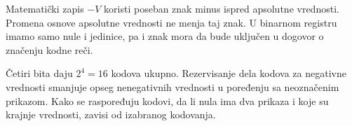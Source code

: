 
Matematički zapis $-V$ koristi poseban znak minus ispred apsolutne vrednosti. Promena osnove apsolutne vrednosti ne menja taj znak. U binarnom registru imamo samo nule i jedinice, pa i znak mora da bude uključen u dogovor o značenju kodne reči.

Četiri bita daju $2^4=16$ kodova ukupno. Rezervisanje dela kodova za negativne vrednosti smanjuje opseg nenegativnih vrednosti u poređenju sa neoznačenim prikazom. Kako se raspoređuju kodovi, da li nula ima dva prikaza i koje su krajnje vrednosti, zavisi od izabranog kodovanja.
